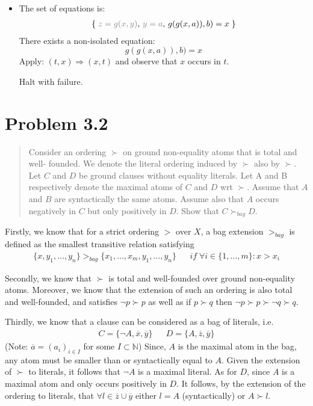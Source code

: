 \documentclass[11pt,a4paper]{article}
\begin{document}
\begin{itemize}
 \item The set of equations is:
\begin{equation*}
\begin{split}
\left\lbrace  \; \textcolor{gray}{z = g(x, y)},\,  \textcolor{gray}{y=a} ,\, g(g(x,a)), b)=x \; \right\rbrace  \\
\end{split}
\end{equation*}
There exists a non-isolated equation: 
\begin{equation*}
g(g(x,a)), b)=x
\end{equation*}
Apply: $(t, x) \Rightarrow (x, t)$ and observe that $x$ occurs in $t$. 

Halt with failure.
\end{itemize}


\section*{Problem 3.2}
\begin{quote}
Consider an ordering $\succ$ on ground non-equality atoms that is total and well-
founded. We denote the literal ordering induced by $\succ$ also by $\succ$. Let $C$ and $D$ be ground clauses without equality literals. Let A and B respectively denote the maximal atoms of $C$ and $D$ wrt $\succ$.
Assume that $A$ and $B$ are syntactically the same atoms. Assume also that $A$ occurs negatively in $C$ but
only positively in $D$. Show that $C \succ_{bag} D$.
\end{quote}


Firstly, we know that for a strict ordering $>$ over $X$, a bag extension $>_{bag}$ is defined as the smallest transitive relation satisfying 
\begin{align*}
& \{x,y_1, \dots, y_n\} >_{bag} \{x_1, \dots, x_m, y_1, \dots , y_n\} && if \; \forall i \in \{1, \dots, m\}: x>x_i & 
\end{align*}


Secondly, we know that $\succ$ is total and well-founded over ground non-equality atoms. Moreover, we know that the extension of such an ordering is also total and well-founded, and satisfies $\neg p \succ p$ as well as if $p \succ q$ then $\neg p \succ p \succ \neg q \succ q$.

Thirdly, we know that a clause can be considered as a bag of literals, i.e.
\begin{align*}
& C=\{\neg A, \overline{x}, \overline{y} \} &&  D=\{A, \overline{z}, \overline{y} \} & 
\end{align*}
(Note: $\overline{a} = (a_i)_{i \in I}$ for some $I \subset \mathbb{N}$)
Since, $A$ is the maximal atom in the bag, any atom must be smaller than or syntactically equal to $A$. Given the extension of $\succ$ to literals, it follows that $\neg A$ is a maximal literal. As for  $D$, since $A$ is a maximal atom and only occurs positively in $D$. It follows, by the extension of the ordering to literals, that $\forall l \in \overline{z} \cup \overline{y}$ either $l = A$ (syntactically) or $A \succ l$. 
\end{document}
